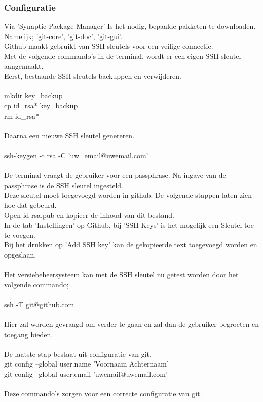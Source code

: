 \documentclass[12pt]{article}
\begin{document}
				\subsubsection{Configuratie}
					Via 'Synaptic Package Manager' Is het nodig, bepaalde pakketen te downloaden. Namelijk; 'git-core', 'git-doc', 'git-gui'.\\
					Github maakt gebruikt van SSH sleutels voor een veilige connectie.\\
					Met de volgende commando's in de terminal, wordt er een eigen SSH sleutel aangemaakt.\\
					Eerst, bestaande SSH sleutels backuppen en verwijderen.\\
					\\
					mkdir key\_backup\\
					cp id\_rsa* key\_backup\\
					rm id\_rsa*
					\\
					\\
					 Daarna een nieuwe SSH sleutel genereren.\\
					 \\
					 ssh-keygen -t rsa -C 'uw\_email@uwemail.com'\\
					 \\
					 De terminal vraagt de gebruiker voor een passphrase.
					 Na ingave van de passphrase is de SSH sleutel ingesteld.\\
					Deze sleutel moet toegevoegd worden in github. De volgende stappen laten zien hoe dat gebeurd.\\
					 Open id-rsa.pub en kopieer de inhoud van dit bestand.\\
					 In de tab 'Instellingen' op Github, bij 'SSH Keys' is het mogelijk een Sleutel toe te voegen.\\
					 Bij het drukken op 'Add SSH key' kan de gekopieerde text toegevoegd worden en opgeslaan.\\
					 \\
					 Het versiebeheersysteem kan met de SSH sleutel nu getest worden door het volgende commando;\\
					 \\
					 ssh -T git@github.com\\
					 \\
					 Hier zal worden gevraagd om verder te gaan en zal dan de gebruiker begroeten en toegang bieden.\\
					 \\
					 De laatste stap bestaat uit configuratie van git.\\
					 git config --global user.name 'Voornaam Achternaam'\\
					 git config --global user.email 'uwemail@uwemail.com'\\
					 \\
					 Deze commando's zorgen voor een correcte configuratie van git.
					
\end{document}
